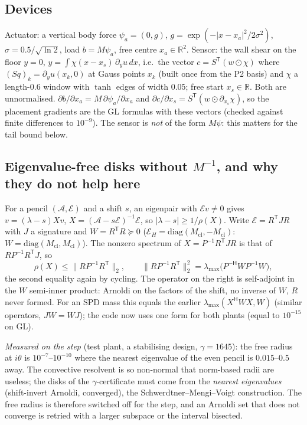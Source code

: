 \documentclass[11pt,a4paper]{article}
\newcommand{\R}{\mathbb{R}}
\newcommand{\hp}{^{\mathsf H}}
\newcommand{\tp}{^{\mathsf T}}   %
\begin{document}
{\subsection{Devices}
Actuator: a vertical body force $\psi_a=(0,g)$,
$g=\exp(-|x-x_a|^2/2\sigma^2)$, $\sigma=0.5/\sqrt{\ln2}$, load $b=M\psi_a$, free centre
$x_a\in\R^2$.  Sensor: the wall shear on the floor $y=0$,
$y=\int\chi(x-x_s)\,\partial_yu\,dx$, i.e.\ the vector $c=S\tp(w\odot\chi)$ where
$(Sq)_k=\partial_yu(x_k,0)$ at Gauss points $x_k$ (built once from the P2 basis) and $\chi$ a
length-$0.6$ window with $\tanh$ edges of width $0.05$; free start $x_s\in\R$.  Both are
unnormalised.  $\partial b/\partial x_a=M\,\partial\psi_a/\partial x_a$ and
$\partial c/\partial x_s=S\tp(w\odot\partial_{x_s}\chi)$, so the placement gradients are the
GL formulas with these vectors (checked against finite differences to $10^{-9}$).  The
sensor is \emph{not} of the form $M\psi$: this matters for the tail bound below.

\subsection{Eigenvalue-free disks without $M^{-1}$, and why they do not help here}
For a pencil $(\mathcal A,\mathcal E)$ and a shift $s$, an eigenpair with $\mathcal Ev\ne0$
gives $v=(\lambda-s)Xv$, $X=(\mathcal A-s\mathcal E)^{-1}\mathcal E$, so
$|\lambda-s|\ge1/\rho(X)$.  Write $\mathcal E=R\tp JR$ with $J$ a signature and
$W=R\tp R\succeq0$ ($\mathcal E_H=\mathrm{diag}(M_{\mathrm{cl}},-M_{\mathrm{cl}})$: $W=\mathrm{diag}(M_{\mathrm{cl}},M_{\mathrm{cl}})$).  The nonzero
spectrum of $X=P^{-1}R\tp JR$ is that of $RP^{-1}R\tp J$, so
\[
\rho(X)\le\|RP^{-1}R\tp\|_2,\qquad \|RP^{-1}R\tp\|_2^2=\lambda_{\max}\bigl(P^{-\mathsf H}WP^{-1}W\bigr),
\]
the second equality again by cycling.  The operator on the right is self-adjoint in the
$W$ semi-inner product: Arnoldi on the factors of the shift, no inverse of $W$, $R$ never
formed.  For an SPD mass this equals the earlier $\lambda_{\max}(X\hp WX,W)$ (similar
operators, $JW=WJ$); the code now uses one form for both plants (equal to $10^{-15}$ on GL).

\emph{Measured on the step} (test plant, a stabilising design, $\gamma=1645$): the free radius
at $i\theta$ is $10^{-7}$--$10^{-10}$ where the nearest eigenvalue of the even pencil is
$0.015$--$0.5$ away.  The convective resolvent is so non-normal that norm-based radii are
useless; the disks of the $\gamma$-certificate must come from the \emph{nearest eigenvalues}
(shift-invert Arnoldi, converged), the Schwerdtner--Mengi--Voigt construction.  The free
radius is therefore switched off for the step, and an Arnoldi set that does not converge is
retried with a larger subspace or the interval bisected.

}
\end{document}
